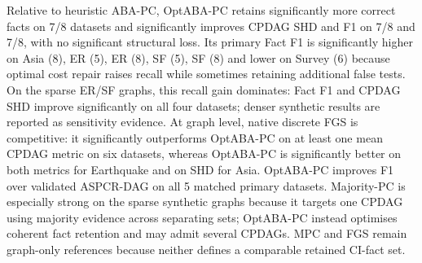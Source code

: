 Relative to heuristic ABA-PC, OptABA-PC retains significantly more correct facts on 7/8 datasets and significantly improves CPDAG SHD and F1 on 7/8 and 7/8, with no significant structural loss. Its primary Fact F1 is significantly higher on Asia (8), ER (5), ER (8), SF (5), SF (8) and lower on Survey (6) because optimal cost repair raises recall while sometimes retaining additional false tests. On the sparse ER/SF graphs, this recall gain dominates: Fact F1 and CPDAG SHD improve significantly on all four datasets; denser synthetic results are reported as sensitivity evidence. At graph level, native discrete FGS is competitive: it significantly outperforms OptABA-PC on at least one mean CPDAG metric on six datasets, whereas OptABA-PC is significantly better on both metrics for Earthquake and on SHD for Asia. OptABA-PC improves F1 over validated ASPCR-DAG on all 5 matched primary datasets. Majority-PC is especially strong on the sparse synthetic graphs because it targets one CPDAG using majority evidence across separating sets; OptABA-PC instead optimises coherent fact retention and may admit several CPDAGs. MPC and FGS remain graph-only references because neither defines a comparable retained CI-fact set.
